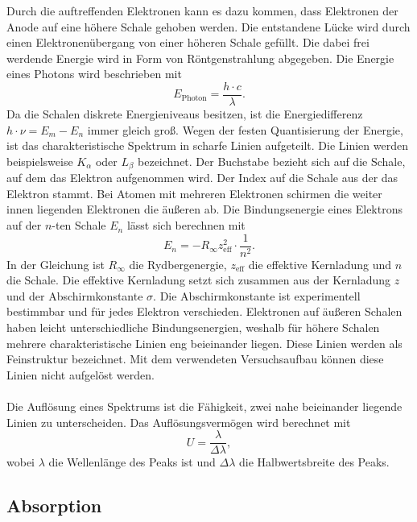 Durch die auftreffenden Elektronen kann es dazu kommen, dass Elektronen der Anode auf eine höhere Schale 
gehoben werden. Die entstandene Lücke wird durch einen Elektronenübergang von einer höheren Schale gefüllt.
Die dabei frei werdende Energie wird in Form von Röntgenstrahlung abgegeben. Die Energie eines Photons wird beschrieben mit
\begin{equation}\label{eq:Energie_Photon}
    E_{\text{Photon}} = \frac{h\cdot c}{\lambda}.
\end{equation}
Da die Schalen diskrete Energieniveaus besitzen,
ist die Energiedifferenz $h \cdot ν = E_m - E_n$ immer gleich groß. Wegen der festen Quantisierung der Energie,
ist das charakteristische Spektrum in scharfe Linien aufgeteilt.
Die Linien werden beispielsweise $K_α$ oder $L_β$ bezeichnet. Der Buchstabe bezieht sich auf die 
Schale, auf dem das Elektron aufgenommen wird. Der Index auf die Schale aus der das Elektron stammt.
Bei Atomen mit mehreren Elektronen schirmen die weiter innen liegenden Elektronen die äußeren ab.
Die Bindungsenergie eines Elektrons auf der $n$-ten Schale $E_n$ lässt sich berechnen mit
\begin{equation*}\label{eq:Bindungsenergie}
    E_n = -R_\infty z_{\text{eff}}^2 \cdot \frac{1}{n^2}.
\end{equation*}
In der Gleichung ist $R_\infty$ die Rydbergenergie, $z_{\text{eff}}$ die effektive Kernladung und $n$ die Schale.
Die effektive Kernladung setzt sich zusammen aus der Kernladung $z$ und der Abschirmkonstante $σ$.
Die Abschirmkonstante ist experimentell bestimmbar und für jedes Elektron verschieden.
Elektronen auf äußeren Schalen haben leicht unterschiedliche Bindungsenergien, weshalb für höhere Schalen
mehrere charakteristische Linien eng beieinander liegen. Diese Linien werden als Feinstruktur bezeichnet. Mit dem verwendeten Versuchsaufbau können diese Linien nicht aufgelöst werden.\\
\\
Die Auflösung eines Spektrums ist die Fähigkeit, zwei nahe beieinander liegende Linien zu unterscheiden. 
Das Auflösungsvermögen wird berechnet mit
\begin{equation}\label{eq:Spektrales_Auflösungsvermögen}
    U = \frac{λ}{Δλ},
\end{equation}
wobei $λ$ die Wellenlänge des Peaks ist und $Δλ$ die Halbwertsbreite des Peaks.\\

\subsection{Absorption}
\label{sec:Absorption}


